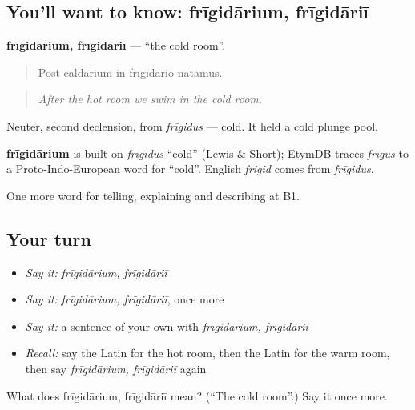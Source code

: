 \subsection*{You'll want to know: frīgidārium, frīgidāriī}
\textbf{frīgidārium, frīgidāriī} — \textquotedblleft{}the cold room\textquotedblright{}.

\begin{quote}
Post caldārium in frīgidāriō natāmus.
\end{quote}

\begin{quote}
\emph{After the hot room we swim in the cold room.}
\end{quote}

Neuter, second declension, from \emph{frīgidus} — cold. It held a cold plunge pool.

\begin{cousinweb}
\textbf{frīgidārium} is built on \emph{frīgidus} \textquotedblleft{}cold\textquotedblright{} (Lewis \& Short); EtymDB traces \emph{frīgus} to a Proto-Indo-European word for \textquotedblleft{}cold\textquotedblright{}. English \emph{frigid} comes from \emph{frīgidus}.
\end{cousinweb}

\begin{grammarlens}[title={What you've built}]
One more word for telling, explaining and describing at B1.
\end{grammarlens}

\subsection*{Your turn}
\begin{itemize}
\raggedright
  \item \emph{Say it:} \emph{frīgidārium, frīgidāriī}
  \item \emph{Say it:} \emph{frīgidārium, frīgidāriī}, once more
  \item \emph{Say it:} a sentence of your own with \emph{frīgidārium, frīgidāriī}
  \item \emph{Recall:} say the Latin for the hot room, then the Latin for the warm room, then say \emph{frīgidārium, frīgidāriī} again
\end{itemize}

\begin{tcolorbox}[breakable,colback=teal!4,colframe=teal!35!black,title={Before you move on}]
What does frīgidārium, frīgidāriī mean? (\textquotedblleft{}The cold room\textquotedblright{}.) Say it once more.
\end{tcolorbox}
